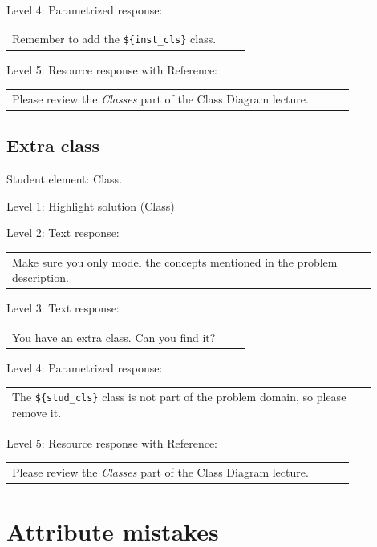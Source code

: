 \noindent Level 4: Parametrized response: \medskip

\begin{tabular}{|p{0.9\linewidth}}
Remember to add the \verb|${inst_cls}| class.
\end{tabular} \medskip

\noindent Level 5: Resource response with Reference: \medskip

\begin{tabular}{|p{0.9\linewidth}}
Please review the \textit{Classes} part of the Class Diagram lecture.
\end{tabular} \medskip


\subsection{Extra class}

Student element: Class.  \medskip

\noindent Level 1: Highlight solution (Class) \medskip

\noindent Level 2: Text response: \medskip

\begin{tabular}{|p{0.9\linewidth}}
Make sure you only model the concepts mentioned in the problem description.
\end{tabular} \medskip

\noindent Level 3: Text response: \medskip

\begin{tabular}{|p{0.9\linewidth}}
You have an extra class. Can you find it?
\end{tabular} \medskip

\noindent Level 4: Parametrized response: \medskip

\begin{tabular}{|p{0.9\linewidth}}
The \verb|${stud_cls}| class is not part of the problem domain, so please remove it.
\end{tabular} \medskip

\noindent Level 5: Resource response with Reference: \medskip

\begin{tabular}{|p{0.9\linewidth}}
Please review the \textit{Classes} part of the Class Diagram lecture.
\end{tabular} \medskip



\section{Attribute mistakes}

